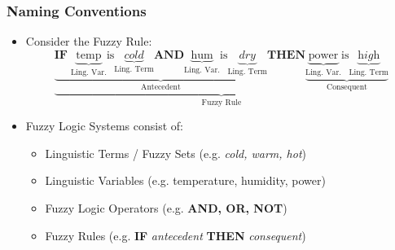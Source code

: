 \documentclass[
	10pt,
	t		%
]{beamer}
\begin{document}
\begin{frame}
	\frametitle{Naming Conventions}

	\begin{itemize}
		\item Consider the Fuzzy Rule:
		      \[
			      \underbrace{  \underbrace{\textbf{IF}  \;\underbrace{\text{temp}}_{\text{Ling. Var.}} \text{is} \underbrace{\textit{cold}}_{\text{Ling. Term}}  \textbf{AND}  \underbrace{\text{hum}}_{\text{Ling. Var.}} \text{is} \underbrace{\textit{dry}}_{\text{Ling. Term}} }_{\text{Antecedent}}
				      \textbf{THEN}  \underbrace{\underbrace{\text{power}}_{\text{Ling. Var.}} \text{is} \underbrace{\textit{high}}_{\text{Ling. Term}}}_{\text{Consequent}}
			      }_{\text{Fuzzy Rule}}
		      \]
		\item Fuzzy Logic Systems consist of:
		      \begin{itemize}
			      \item Linguistic Terms / Fuzzy Sets (e.g. \textit{cold, warm, hot})
			      \item Linguistic Variables (e.g. temperature, humidity, power)
			      \item Fuzzy Logic Operators (e.g. \textbf{AND, OR, NOT})
			      \item Fuzzy Rules (e.g. \textbf{IF} \textit{antecedent} \textbf{THEN} \textit{consequent})
		      \end{itemize}
	\end{itemize}
\end{frame}
\end{document}
